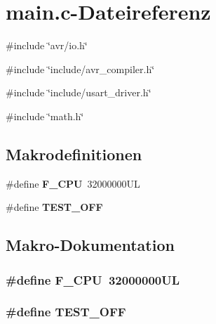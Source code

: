 \section{main.c-\/Dateireferenz}
\label{main_8c}
{\ttfamily \#include \char`\"{}avr/io.h\char`\"{}}\par
{\ttfamily \#include \char`\"{}include/avr\_\-compiler.h\char`\"{}}\par
{\ttfamily \#include \char`\"{}include/usart\_\-driver.h\char`\"{}}\par
{\ttfamily \#include \char`\"{}math.h\char`\"{}}\par
\subsection*{Makrodefinitionen}
\begin{DoxyCompactItemize}
\item 
\#define {\bf F\_\-CPU}~32000000UL
\item 
\#define {\bf TEST\_\-OFF}
\end{DoxyCompactItemize}


\subsection{Makro-\/Dokumentation}
\subsubsection[{F\_\-CPU}]{\setlength{\rightskip}{0pt plus 5cm}\#define F\_\-CPU~32000000UL}\label{main_8c_a43bafb28b29491ec7f871319b5a3b2f8}
\subsubsection[{TEST\_\-OFF}]{\setlength{\rightskip}{0pt plus 5cm}\#define TEST\_\-OFF}\label{main_8c_a8f6764e8e57eabbb14922404c0e25175}
